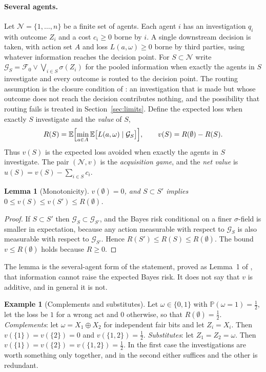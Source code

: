 \documentclass[11pt]{article}
\newcommand{\F}{\mathcal F}
\newcommand{\G}{\mathcal G}
\newcommand{\N}{\mathcal N}
\newcommand{\PP}{\mathbb P}
\newcommand{\E}{\mathbb E}
\theoremstyle{plain}
\newtheorem{lemma}{Lemma}
\theoremstyle{definition}
\newtheorem{example}{Example}
\begin{document}
\paragraph{Several agents.} Let $\N=\{1,\dots,n\}$ be a finite set of agents. Each agent $i$ has an investigation $q_i$ with outcome $Z_i$ and a cost $c_i\ge0$ borne by $i$. A single downstream decision is taken, with action set $A$ and loss $L(a,\omega)\ge0$ borne by third parties, using whatever information reaches the decision point. For $S\subset\N$ write $\G_S=\F_0\vee\bigvee_{i\in S}\sigma(Z_i)$ for the pooled information when exactly the agents in $S$ investigate and every outcome is routed to the decision point. The routing assumption is the closure condition of \cite{flyxion2026inputs}: an investigation that is made but whose outcome does not reach the decision contributes nothing, and the possibility that routing fails is treated in Section~\ref{sec:limits}. Define the expected loss when exactly $S$ investigate and the \emph{value} of $S$,
\[
R(S)=\E\Bigl[\min_{a\in A}\E\bigl[L(a,\omega)\mid\G_S\bigr]\Bigr],\qquad v(S)=R(\emptyset)-R(S).
\]
Thus $v(S)$ is the expected loss avoided when exactly the agents in $S$ investigate. The pair $(\N,v)$ is the \emph{acquisition game}, and the \emph{net value} is $u(S)=v(S)-\sum_{i\in S}c_i$.

\begin{lemma}[Monotonicity]\label{lem:mono}
$v(\emptyset)=0$, and $S\subset S'$ implies $0\le v(S)\le v(S')\le R(\emptyset)$.
\end{lemma}

\begin{proof}
If $S\subset S'$ then $\G_S\subset\G_{S'}$, and the Bayes risk conditional on a finer $\sigma$-field is smaller in expectation, because any action measurable with respect to $\G_S$ is also measurable with respect to $\G_{S'}$. Hence $R(S')\le R(S)\le R(\emptyset)$. The bound $v\le R(\emptyset)$ holds because $R\ge0$.
\end{proof}

The lemma is the several-agent form of the statement, proved as Lemma~1 of \cite{flyxion2026stop}, that information cannot raise the expected Bayes risk. It does not say that $v$ is additive, and in general it is not.

\begin{example}[Complements and substitutes]\label{ex:xor}
Let $\omega\in\{0,1\}$ with $\PP(\omega=1)=\tfrac12$, let the loss be $1$ for a wrong act and $0$ otherwise, so that $R(\emptyset)=\tfrac12$. \emph{Complements}: let $\omega=X_1\oplus X_2$ for independent fair bits and let $Z_i=X_i$. Then $v(\{1\})=v(\{2\})=0$ and $v(\{1,2\})=\tfrac12$. \emph{Substitutes}: let $Z_1=Z_2=\omega$. Then $v(\{1\})=v(\{2\})=v(\{1,2\})=\tfrac12$. In the first case the investigations are worth something only together, and in the second either suffices and the other is redundant.
\end{example}
\end{document}
